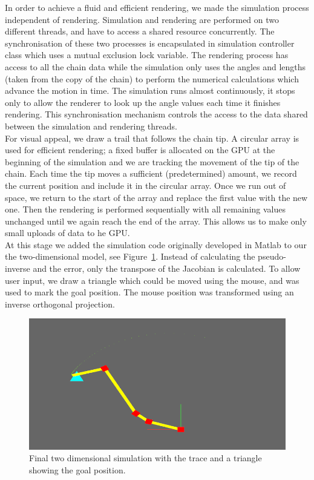 \documentclass[paper=a4, fontsize=11pt]{scrartcl} %
\numberwithin{equation}{section} %
\numberwithin{figure}{section} %
\numberwithin{table}{section} %
\begin{document}
In order to achieve a fluid and efficient rendering, we made the simulation process independent of rendering. Simulation and rendering are performed on two different threads, and have to access a shared resource concurrently. The synchronisation of these two processes is encapsulated in simulation controller class which uses a mutual exclusion lock variable. The rendering process has access to all the chain data while the simulation only uses the angles and lengths (taken from the copy of the chain) to perform the numerical calculations which advance the motion in time. The simulation runs almost continuously, it stops only to allow the renderer to look up the angle values each time it finishes rendering. This synchronisation mechanism controls the access to the data shared between the simulation and rendering threads. \\

For visual appeal, we draw a trail that follows the chain tip. A circular array is used for efficient rendering; a fixed buffer is allocated on the GPU at the beginning of the simulation and we are tracking the movement of the tip of the chain. Each time the tip moves a sufficient (predetermined) amount, we record the current position and include it in the circular array. Once we run out of space, we return to the start of the array and replace the first value with the new one. Then the rendering is performed sequentially with all remaining values unchanged until we again reach the end of the array. This allows us to make only small uploads of data to he GPU. \\

At this stage we added the simulation code originally developed in Matlab to our the two-dimensional model, see Figure~\ref{fig:2Dpicture}. Instead of calculating the pseudo-inverse and the error, only the transpose of the Jacobian is calculated. To allow user input, we draw a triangle which could be moved using the mouse, and was used to mark the goal position. The mouse position was transformed using an inverse orthogonal projection. \\

\begin{figure}[h]
\centering
\includegraphics[scale=0.4]{chain2Dv2}
\caption{Final two dimensional simulation with the trace and a triangle showing the goal position.}
\label{fig:2Dpicture}
\end{figure}
\end{document}
